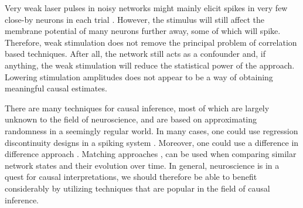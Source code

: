 \documentclass[11pt]{article}
\begin{document}
Very weak laser pulses in noisy networks might mainly elicit spikes in very few close-by neurons in each trial \citep{English2017}. 
However, the stimulus will still affect the membrane potential of many neurons further away, some of which will spike. 
Therefore, weak stimulation does not remove the principal problem of correlation based techniques. 
After all, the network still acts as a confounder and, if anything, the weak stimulation will reduce the statistical power of the approach. 
Lowering stimulation amplitudes does not appear to be a way of obtaining meaningful causal estimates.

There are many techniques for causal inference, most of which are largely unknown to the field of neuroscience, and are based on approximating randomness in a seemingly regular world. 
In many cases, one could use regression discontinuity designs in a spiking system \citep{lansdell2018spiking, imbens2008regression}. 
Moreover, one could use a difference in difference approach \citep{abadie2005semiparametric}. 
Matching approaches \citep{stuart2010matching, king2016propensity}, can be used when comparing similar network states and their evolution over time. 
In general, neuroscience is in a quest for causal interpretations, we should therefore be able to benefit considerably by utilizing techniques that are popular in the field of causal inference.


\end{document}
